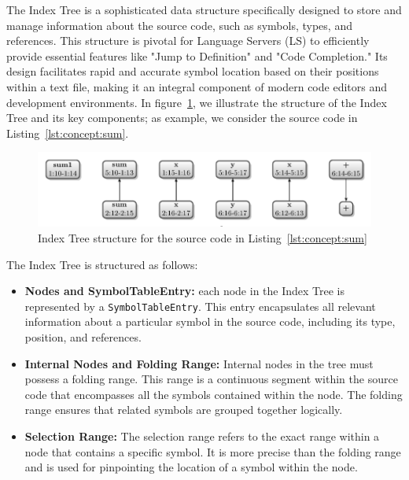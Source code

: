 The Index Tree is a sophisticated data structure specifically designed to store and manage information about the source code, such as symbols, types, and references. This structure is pivotal for Language Servers (LS) to efficiently provide essential features like "Jump to Definition" and "Code Completion." Its design facilitates rapid and accurate symbol location based on their positions within a text file, making it an integral component of modern code editors and development environments. In figure~\ref{lst:conept:lsp_combinations}, we illustrate the structure of the Index Tree and its key components; as example, we consider the source code in Listing~\ref{lst:concept:sum}.

\begin{figure}[t]
    \centering
    \includegraphics[width=0.9\linewidth]{figs/concept/index_tree.pdf}
    \caption{Index Tree structure for the source code in Listing~\ref{lst:concept:sum}}
    \label{lst:conept:lsp_combinations}
\end{figure}


The Index Tree is structured as follows:
\begin{itemize}
    \item \textbf{Nodes and SymbolTableEntry:} each node in the Index Tree is represented by a \texttt{SymbolTableEntry}. This entry encapsulates all relevant information about a particular symbol in the source code, including its type, position, and references.
    \item \textbf{Internal Nodes and Folding Range:} Internal nodes in the tree must possess a folding range. This range is a continuous segment within the source code that encompasses all the symbols contained within the node. The folding range ensures that related symbols are grouped together logically.
    \item \textbf{Selection Range:} The selection range refers to the exact range within a node that contains a specific symbol. It is more precise than the folding range and is used for pinpointing the location of a symbol within the node.
\end{itemize}

